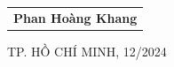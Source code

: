 \documentclass[13pt,a4paper,font=cm]{report}
\theoremstyle{definition}
\begin{document}
\begin{titlepage}
\begin{center}
\begin{tabular}{c}
\\ \vspace{0.5cm} {\textbf{{\LARGE Phan Hoàng Khang}}}
\end{tabular}
\end{center}
\vspace{0.5cm}
\begin{center}
{\Large TP. HỒ CHÍ MINH, 12/2024 }
\end{center}
\end{titlepage}
\thispagestyle{empty}
\newpage
\end{document}
